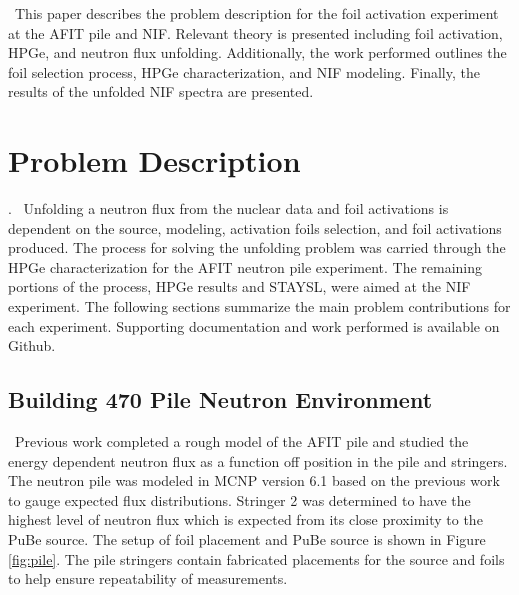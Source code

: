\documentclass[journal]{IEEEtran}
\begin{document}
\ This paper describes the problem description for the foil activation experiment at the AFIT pile and NIF. Relevant theory is presented including foil activation, HPGe, and neutron flux unfolding. Additionally, the work performed outlines the foil selection process, HPGe characterization, and NIF modeling. Finally, the results of the unfolded NIF spectra are presented. 

\section{Problem Description}.
\ Unfolding a neutron flux from the nuclear data and foil activations is dependent on the source, modeling, activation foils selection, and foil activations produced. The process for solving the unfolding problem was carried through the HPGe characterization for the AFIT neutron pile experiment. The remaining portions of the process, HPGe results and STAYSL, were aimed at the NIF experiment. The following sections summarize the main problem contributions for each experiment.  Supporting documentation and work performed is available on Github\cite{Me}. 

\subsection{Building 470 Pile Neutron Environment }
\ Previous work completed a rough model of the AFIT pile and studied the energy dependent neutron flux as a function off position in the pile and stringers\cite{Will}. The neutron pile was modeled in MCNP version 6.1 
based on the previous work to gauge expected flux distributions\cite{MCNP}. Stringer 2 was determined to have the highest level of neutron flux which is expected from its close proximity to the PuBe source. The setup of foil placement and PuBe source is shown in Figure \ref{fig:pile}. The pile stringers contain fabricated placements for the source and foils to help ensure repeatability of measurements. 
\end{document}
